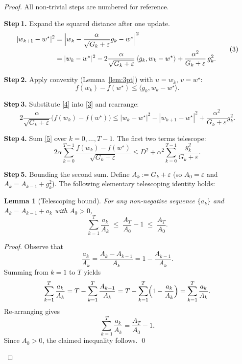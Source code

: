 \documentclass{article}
\newtheorem{lemma}{Lemma}
\begin{document}
\begin{proof}
All non‑trivial steps are numbered for reference.

\noindent\textbf{Step 1.}  Expand the squared distance after one update.
\[
\begin{aligned}
|w_{k+1}-w^{\star}|^{2}
&= \Bigl|w_{k}-\frac{\alpha}{\sqrt{G_{k}+\varepsilon}}g_{k}-w^{\star}\Bigr|^{2}\\
&=|w_{k}-w^{\star}|^{2}
-2\frac{\alpha}{\sqrt{G_{k}+\varepsilon}}\,
\langle g_{k},w_{k}-w^{\star}\rangle
+\frac{\alpha^{2}}{G_{k}+\varepsilon}\,g_{k}^{2}.
\end{aligned}
\tag{3}
\]

\noindent\textbf{Step 2.}  Apply convexity (Lemma~\ref{lem:3pt}) with $u=w_{k}$,
$v=w^{\star}$:
\[
f(w_{k})-f(w^{\star})\le\langle g_{k},w_{k}-w^{\star}\rangle .
\tag{4}
\]

\noindent\textbf{Step 3.}  Substitute \eqref{4} into \eqref{3} and rearrange:
\[
2\frac{\alpha}{\sqrt{G_{k}+\varepsilon}}\bigl(f(w_{k})-f(w^{\star})\bigr)
\le
|w_{k}-w^{\star}|^{2}
-|w_{k+1}-w^{\star}|^{2}
+\frac{\alpha^{2}}{G_{k}+\varepsilon}g_{k}^{2}.
\tag{5}
\]

\noindent\textbf{Step 4.}  Sum \eqref{5} over $k=0,\dots,T-1$.
The first two terms telescope:
\[
2\alpha\sum_{k=0}^{T-1}
\frac{f(w_{k})-f(w^{\star})}{\sqrt{G_{k}+\varepsilon}}
\le
D^{2}
+\alpha^{2}\sum_{k=0}^{T-1}\frac{g_{k}^{2}}{G_{k}+\varepsilon}.
\tag{6}
\]

\noindent\textbf{Step 5.}  Bounding the second sum.  
Define $A_{k}:=G_{k}+\varepsilon$ (so $A_{0}=\varepsilon$ and $A_{k}=A_{k-1}+g_{k}^{2}$).  
The following elementary telescoping identity holds:

\begin{lemma}[Telescoping bound]\label{lem:telescoping}
For any non‑negative sequence $\{a_{k}\}$ and $A_{k}=A_{k-1}+a_{k}$ with $A_{0}>0$,
\[
\sum_{k=1}^{T}\frac{a_{k}}{A_{k}}
\;\le\;
\frac{A_{T}}{A_{0}}-1
\;\le\;
\frac{A_{T}}{A_{0}} .
\tag{7}
\]
\end{lemma}
\begin{proof}
Observe that
\[
\frac{a_{k}}{A_{k}}
= \frac{A_{k}-A_{k-1}}{A_{k}}
=1-\frac{A_{k-1}}{A_{k}} .
\]
Summing from $k=1$ to $T$ yields
\[
\sum_{k=1}^{T}\frac{a_{k}}{A_{k}}
= T-\sum_{k=1}^{T}\frac{A_{k-1}}{A_{k}}
= T-\sum_{k=1}^{T}\Bigl(1-\frac{a_{k}}{A_{k}}\Bigr)
= \sum_{k=1}^{T}\frac{a_{k}}{A_{k}} .
\]
Re‑arranging gives
\[
\sum_{k=1}^{T}\frac{a_{k}}{A_{k}}
= \frac{A_{T}}{A_{0}}-1 .
\]
Since $A_{0}>0$, the claimed inequality follows. \qed
\end{proof}


\end{proof}
\end{document}
